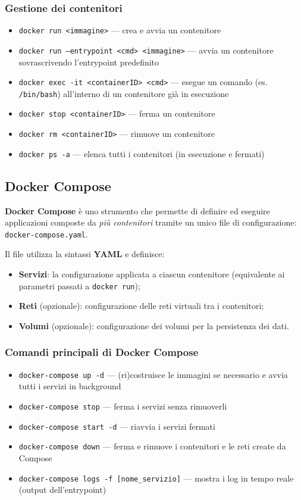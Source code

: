 \documentclass{article}
\begin{document}
\subsubsection*{Gestione dei contenitori}
\begin{itemize}
    \item \texttt{docker run <immagine>} --- crea e avvia un contenitore
    \item \texttt{docker run --entrypoint <cmd> <immagine>} --- avvia un contenitore sovrascrivendo l'entrypoint predefinito
    \item \texttt{docker exec -it <containerID> <cmd>} --- esegue un comando (es. \texttt{/bin/bash}) all'interno di un contenitore già in esecuzione
    \item \texttt{docker stop <containerID>} --- ferma un contenitore
    \item \texttt{docker rm <containerID>} --- rimuove un contenitore
    \item \texttt{docker ps -a} --- elenca tutti i contenitori (in esecuzione e fermati)
\end{itemize}

\subsection*{Docker Compose}

\textbf{Docker Compose} è uno strumento che permette di definire ed eseguire applicazioni composte da \textit{più contenitori} tramite un unico file di configurazione: \texttt{docker-compose.yaml}.

Il file utilizza la sintassi \textbf{YAML} e definisce:
\begin{itemize}
    \item \textbf{Servizi}: la configurazione applicata a ciascun contenitore (equivalente ai parametri passati a \texttt{docker run});
    \item \textbf{Reti} (opzionale): configurazione delle reti virtuali tra i contenitori;
    \item \textbf{Volumi} (opzionale): configurazione dei volumi per la persistenza dei dati.
\end{itemize}

\subsubsection*{Comandi principali di Docker Compose}
\begin{itemize}
    \item \texttt{docker-compose up -d} --- (ri)costruisce le immagini se necessario e avvia tutti i servizi in background
    \item \texttt{docker-compose stop} --- ferma i servizi senza rimuoverli
    \item \texttt{docker-compose start -d} --- riavvia i servizi fermati
    \item \texttt{docker-compose down} --- ferma e rimuove i contenitori e le reti create da Compose
    \item \texttt{docker-compose logs -f [nome\_servizio]} --- mostra i log in tempo reale (output dell'entrypoint)
\end{itemize}
\end{document}
